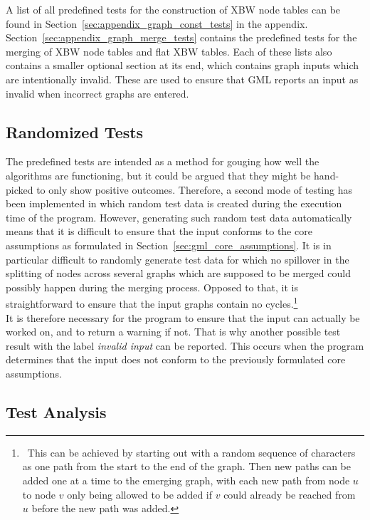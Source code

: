 \documentclass[a4paper,12pt,twoside,BCOR=10mm]{scrbook}
\begin{document}
A list of all predefined tests for the construction of XBW node tables can be found
in Section~\ref{sec:appendix_graph_const_tests} in the appendix.
Section~\ref{sec:appendix_graph_merge_tests} contains the predefined tests for
the merging of XBW node tables and flat XBW tables.
Each of these lists also contains a smaller optional section at its end,
which contains graph inputs which are intentionally invalid. These are used
to ensure that GML reports an input as invalid when incorrect graphs are entered.

\subsection{Randomized Tests}

The predefined tests are intended as a method for gouging how well the algorithms
are functioning, but it could be argued that they might be hand-picked
to only show positive outcomes.
Therefore, a second mode of testing has been implemented
in which random test data is created during the execution time of the program.
However, generating such random test data automatically means
that it is difficult to ensure that the input conforms
to the core assumptions as formulated in Section~\ref{sec:gml_core_assumptions}.
It is in particular difficult to randomly generate test data for which
no spillover in the splitting of nodes across several graphs which are
supposed to be merged could possibly happen during the merging process.
Opposed to that, it is straightforward to ensure that the input graphs
contain no cycles.\footnote{\,\,\,This can be achieved by starting out with a
random sequence of characters as one path from the start to the end
of the graph.
Then new paths can be added one at a time to the emerging
graph, with each new path from node $ u $ to node $ v $ only being
allowed to be added if $ v $ could already be reached from $ u $ before
the new path was added.} \\
It is therefore necessary for the program to ensure that the
input can actually be worked on, and to return a warning if not.
That is why another possible test result with the label \textit{invalid input} can be reported.
This occurs when the program determines that the input does not conform
to the previously formulated core assumptions.

\subsection{Test Analysis}
\end{document}
